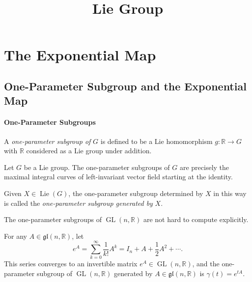 


\title{Lie Group}
\label{chapter-Lie-group}

\section{The Exponential Map}
\label{section-the-exponential-map}

\subsection{One-Parameter Subgroup and the Exponential Map}
\label{subsection-one-parameter-subgroup-and-the-exponential-map}

\paragraph{One-Parameter Subgroups}

\begin{definition}
  \label{definition-one-parameter-subgroup}
  A \emph{one-parameter subgroup of} \( G \) is defined to be a Lie homomorphism \( g: \mathbb{R} \to G \) with \( \mathbb{R} \) considered as a Lie group under addition.
\end{definition}

\begin{theorem}
  \label{theorem-characterization-one-parameter-subgroup}
  Let \( G \) be a Lie group.
  The one-parameter subgroups of \( G \) are precisely the maximal integral curves of left-invariant vector field starting at the identity.
\end{theorem}

\begin{definition}
  \label{definition-generated-one-parameter-subgroup}
  Given \( X \in \operatorname{Lie}(G) \), the one-parameter subgroup determined by \( X \) in this way is called the \emph{one-parameter subgroup generated by} \( X \).
\end{definition}

The one-parameter subgroups of \( \operatorname{GL}(n, \mathbb{R}) \) are not hard to compute explicitly.

\begin{proposition}
  \label{proposition-one-parameter-subgroup-of-GL}
  For any \( A \in \mathfrak{gl}(n, \mathbb{R}) \), let
  \[
    e^A = \sum_{k = 0}^{\infty} \frac{1}{k!} A^k = I_n + A + \frac{1}{2} A^2 + \cdots.
  \]
  This series converges to an invertible matrix \( e^A \in \operatorname{GL}(n, \mathbb{R}) \), and the one-parameter subgroup of \( \operatorname{GL}(n, \mathbb{R}) \) generated by \( A \in \mathfrak{gl}(n, \mathbb{R}) \) is \( \gamma(t) = e^{tA} \).
\end{proposition}

